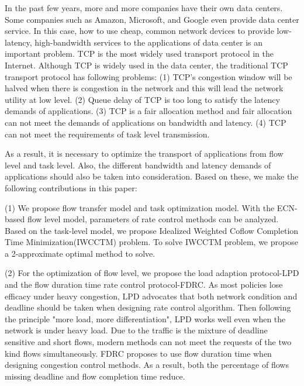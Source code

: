 \begin{eabstract}
In the past few years, more and more companies have their own data centers.
Some companies such as Amazon, Microsoft, and Google even provide data center service. 
In this case, how to use cheap, common network devices to provide low-latency, high-bandwidth services to the applications of data center is an important problem. TCP is the most widely used transport protocol in the Internet. 
Although TCP is widely used in the data center, 
the traditional TCP transport protocol has following problems:
 (1) TCP's congestion window will be halved when there is congestion in the network
 and this will lead the network utility at low level.
 (2) Queue delay of TCP is too long to satisfy the latency demands of applications. 
 (3) TCP is a fair allocation method and fair allocation can not meet the demands of applications on bandwidth and latency. 
 (4) TCP can not meet the requirements of task level transmission.
 
As a result, it is necessary to optimize the transport of applications from flow level and task level.
Also, the different bandwidth and latency demands of applications should also be taken into consideration.
Based on these, we make the following contributions in this paper:
 
(1) We propose flow transfer model and task optimization model. 
With the ECN-based flow level model, parameters of rate control methods can be analyzed.
Based on the task-level model, we propose Idealized Weighted Coflow Completion Time Minimization(IWCCTM) problem.
To solve IWCCTM problem, we propose a 2-approximate optimal method to solve.
  
(2) For the optimization of flow level, 
we propose the load adaption protocol-LPD and the flow duration time rate control protocol-FDRC.
As most policies lose efficacy under heavy congestion,
LPD advocates that both network condition and deadline should be taken when designing rate control algorithm.
Then following the principle "more load, more differentiation", LPD works well even when the network is under heavy load.
Due to the traffic is the mixture of deadline sensitive and short flows, modern methods can not meet the requests of the two kind flows simultaneously.
FDRC proposes to use flow duration time when designing congestion control methods.
As a result, both the percentage of flows missing deadline and flow completion time reduce.


\end{eabstract}
